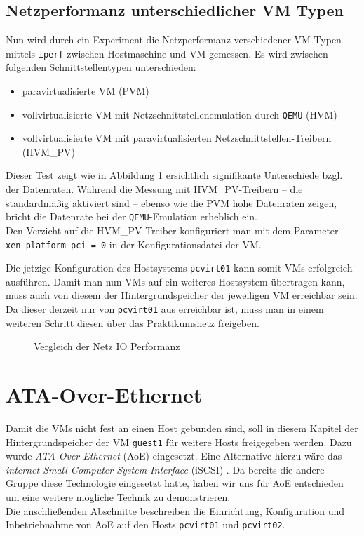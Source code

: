 \section{Netzperformanz unterschiedlicher VM Typen}\label{perf}

Nun wird durch ein Experiment die Netzperformanz verschiedener VM-Typen mittels \verb#iperf# zwischen Hostmaschine und VM gemessen. Es wird zwischen folgenden Schnittstellentypen unterschieden:
\begin{itemize}
\item paravirtualisierte VM (PVM)
\item vollvirtualisierte VM mit Netzschnittstellenemulation durch \verb#QEMU# (HVM)
\item vollvirtualisierte VM mit paravirtualisierten Netzschnittstellen-Treibern (HVM\_PV)
\end{itemize}

Dieser Test zeigt wie in Abbildung \ref{megaplot} ersichtlich signifikante Unterschiede bzgl. der Datenraten. Während die Messung mit HVM\_PV-Treibern -- die standardmäßig aktiviert sind -- ebenso wie die PVM hohe Datenraten zeigen, bricht die Datenrate bei der \verb#QEMU#-Emulation erheblich ein.
\\
Den Verzicht auf die HVM\_PV-Treiber konfiguriert man mit dem Parameter \verb#xen_platform_pci = 0# in der Konfigurationsdatei der VM.

Die jetzige Konfiguration des Hostsystems \verb#pcvirt01# kann somit VMs erfolgreich ausführen. Damit man nun VMs auf ein weiteres Hostsystem übertragen kann, muss auch von diesem der Hintergrundspeicher der jeweiligen VM erreichbar sein. Da dieser derzeit nur von \verb#pcvirt01# aus erreichbar ist, muss man in einem weiteren Schritt diesen über das Praktikumsnetz freigeben.
\begin{figure}

\caption{Vergleich der Netz IO Performanz}
\label{megaplot}
\end{figure}
\chapter{ATA-Over-Ethernet}
\label{chap:aoe}
Damit die VMs nicht fest an einen Host gebunden sind, soll in diesem Kapitel der Hintergrundspeicher der VM \verb#guest1# für weitere Hosts freigegeben werden. Dazu wurde \emph{ATA-Over-Ethernet} (AoE) \cite{hopkins2006aoe} eingesetzt. Eine Alternative hierzu wäre das \emph{internet Small Computer System Interface} (iSCSI) \cite{rfc3720}. Da bereits die andere Gruppe diese Technologie eingesetzt hatte, haben wir uns für AoE entschieden um eine weitere mögliche Technik zu demonstrieren. 
\\
Die anschließenden Abschnitte beschreiben die Einrichtung, Konfiguration und Inbetriebnahme von AoE auf den Hosts \verb#pcvirt01# und \verb#pcvirt02#.

